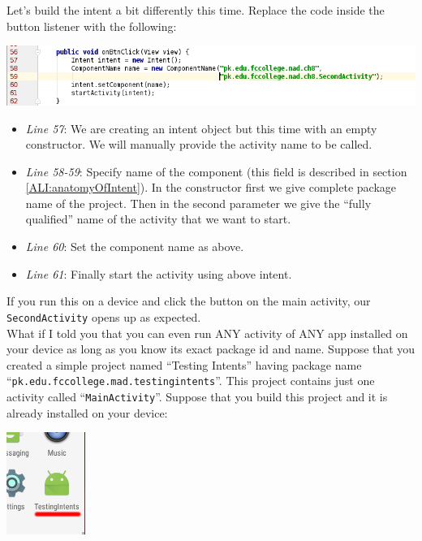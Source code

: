 Let's build the intent a bit differently this time. Replace the code inside the button listener with the following:

\begin{center}
	\includegraphics[scale=0.4]{chapters/ch09/images/17}
\end{center}

\begin{itemize}
	\item \textit{Line 57}: We are creating an intent object but this time with an empty constructor. We will manually provide the activity name to be called.
	
	\item \textit{Line 58-59}: Specify name of the component (this field is described in section \ref{ALI:anatomyOfIntent}). In the constructor first we give complete package name of the project. Then in the second parameter we give the ``fully qualified'' name of the activity that we want to start.
	
	\item \textit{Line 60}: Set the component name as above.
	
	\item \textit{Line 61}: Finally start the activity using above intent.
\end{itemize}

If you run this on a device and click the button on the main activity, our \texttt{SecondActivity} opens up as expected. \\

What if I told you that you can even run ANY activity of ANY app installed on your device as long as you know its exact package id and name. Suppose that you created a simple project named ``Testing Intents'' having package name ``\texttt{pk.edu.fccollege.mad.testingintents}''. This project contains just one activity called ``\texttt{MainActivity}''. Suppose that you build this project and it is already installed on your device:

\begin{center}
	\includegraphics[scale=0.4]{chapters/ch09/images/20}
\end{center}

